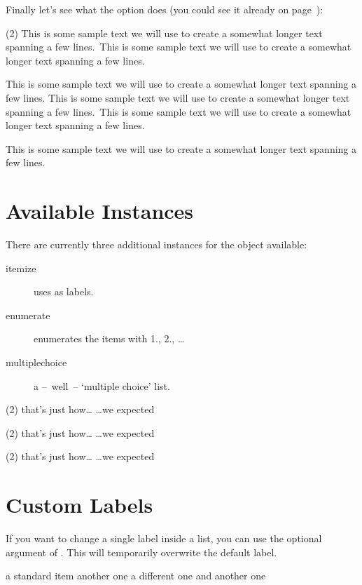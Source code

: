 \documentclass[load-preamble+]{cnltx-doc}
\newcommand*\sample{This is some sample text we will use to create a somewhat
  longer text spanning a few lines.}
\newcommand*\Sample{\sample\ \sample\par\sample}
\begin{document}
Finally let's see what the  option does (you could see it
already on page~\pageref{debug}):
\begin{example}
  \begin{tasks}(2)
    \task \Sample
    \task \Sample
  \end{tasks}
\end{example}

\section{Available Instances}\label{sec:tasks:instances}
There are currently three additional instances for the  object
available:
\begin{description}
  \item[itemize] uses  as labels.
  \item[enumerate] enumerates the items with 1., 2., \ldots
  \item[multiplechoice] a --~well~-- `multiple choice' list.
\end{description}
\begin{example}
  \begin{tasks}[style=itemize](2)
    \task that's just how\ldots
    \task \ldots we expected
  \end{tasks}
  \begin{tasks}[style=enumerate](2)
    \task that's just how\ldots
    \task \ldots we expected
  \end{tasks}
  \begin{tasks}[style=multiplechoice](2)
    \task that's just how\ldots
    \task \ldots we expected
  \end{tasks}
\end{example}

\section{Custom Labels}
If you want to change a single label inside a list, you can use the optional
argument of . This will temporarily overwrite the default label.
\begin{example}
  \begin{tasks}[style=itemize]
    \task a standard item
    \task another one
    \task[+] a different one
    \task and another one
  \end{tasks}
\end{example}
\end{document}
